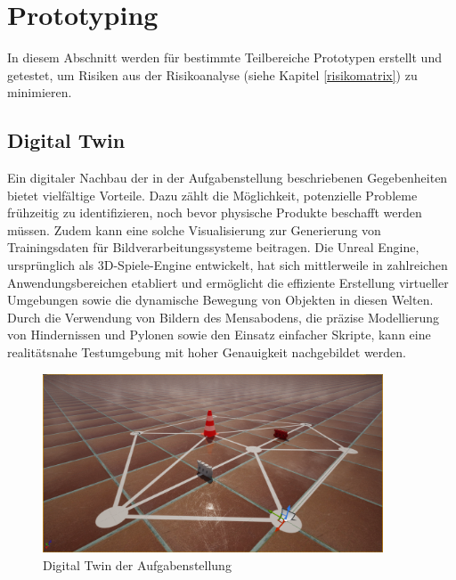 \documentclass[../main.tex]{subfiles}
\begin{document}
\newpage
\section{Prototyping} \label{a4:prototyping}

In diesem Abschnitt werden für bestimmte Teilbereiche Prototypen erstellt und getestet,  
um Risiken aus der Risikoanalyse (siehe Kapitel \ref{risikomatrix}) zu minimieren.

\subsection{Digital Twin}
Ein digitaler Nachbau der in der Aufgabenstellung beschriebenen Gegebenheiten bietet vielfältige Vorteile. Dazu zählt die Möglichkeit, potenzielle Probleme frühzeitig zu identifizieren, noch bevor physische Produkte beschafft werden müssen. Zudem kann eine solche Visualisierung zur Generierung von Trainingsdaten für Bildverarbeitungssysteme beitragen. Die Unreal Engine, ursprünglich als 3D-Spiele-Engine entwickelt, hat sich mittlerweile in zahlreichen Anwendungsbereichen etabliert und ermöglicht die effiziente Erstellung virtueller Umgebungen sowie die dynamische Bewegung von Objekten in diesen Welten. Durch die Verwendung von Bildern des Mensabodens, die präzise Modellierung von Hindernissen und Pylonen sowie den Einsatz einfacher Skripte, kann eine realitätsnahe Testumgebung mit hoher Genauigkeit nachgebildet werden.

\begin{figure}[H]
    \centering
    \includegraphics[width=0.9\textwidth]{img/unrealengine/overview.png}
    \caption{Digital Twin der Aufgabenstellung}
\label{img:Übersicht Unreal Engine}
\end{figure}
\end{document}
